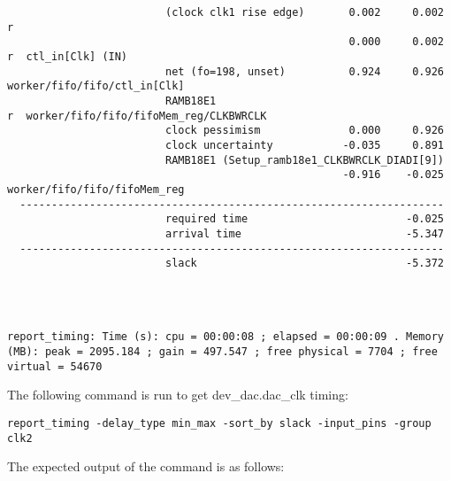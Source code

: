 \documentclass{article}
\begin{document}
\begin{lstlisting}
                         (clock clk1 rise edge)       0.002     0.002 r
                                                      0.000     0.002 r  ctl_in[Clk] (IN)
                         net (fo=198, unset)          0.924     0.926    worker/fifo/fifo/ctl_in[Clk]
                         RAMB18E1                                     r  worker/fifo/fifo/fifoMem_reg/CLKBWRCLK
                         clock pessimism              0.000     0.926
                         clock uncertainty           -0.035     0.891
                         RAMB18E1 (Setup_ramb18e1_CLKBWRCLK_DIADI[9])
                                                     -0.916    -0.025    worker/fifo/fifo/fifoMem_reg
  -------------------------------------------------------------------
                         required time                         -0.025
                         arrival time                          -5.347
  -------------------------------------------------------------------
                         slack                                 -5.372




report_timing: Time (s): cpu = 00:00:08 ; elapsed = 00:00:09 . Memory (MB): peak = 2095.184 ; gain = 497.547 ; free physical = 7704 ; free virtual = 54670
\end{lstlisting}
\fontsize{10}{12}\selectfont
The following command is run to get dev\_dac.dac\_clk timing:
\begin{lstlisting}
report_timing -delay_type min_max -sort_by slack -input_pins -group clk2
\end{lstlisting}
The expected output of the command is as follows:
\fontsize{6}{12}\selectfont
\end{document}
